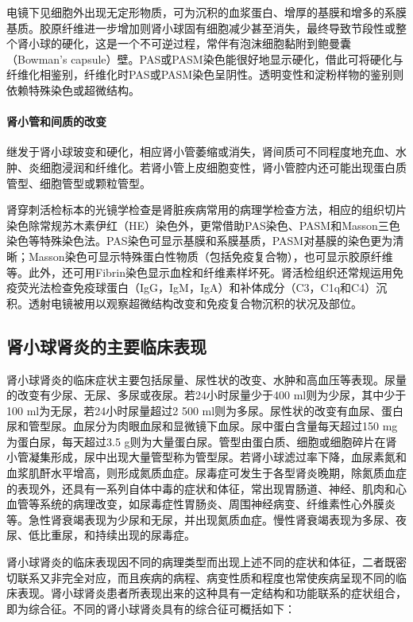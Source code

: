 电镜下见细胞外出现无定形物质，可为沉积的血浆蛋白、增厚的基膜和增多的系膜基质。胶原纤维进一步增加则肾小球固有细胞减少甚至消失，最终导致节段性或整个肾小球的硬化，这是一个不可逆过程，常伴有泡沫细胞黏附到鲍曼囊（Bowman's
capsule）壁。PAS或PASM染色能很好地显示硬化，借此可将硬化与纤维化相鉴别，纤维化时PAS或PASM染色呈阴性。透明变性和淀粉样物的鉴别则依赖特殊染色或超微结构。

\paragraph{肾小管和间质的改变}
继发于肾小球玻变和硬化，相应肾小管萎缩或消失，肾间质可不同程度地充血、水肿、炎细胞浸润和纤维化。若肾小管上皮细胞变性，肾小管腔内还可能出现蛋白质管型、细胞管型或颗粒管型。

肾穿刺活检标本的光镜学检查是肾脏疾病常用的病理学检查方法，相应的组织切片染色除常规苏木素伊红（HE）染色外，更常借助PAS染色、PASM和Masson三色染色等特殊染色法。PAS染色可显示基膜和系膜基质，PASM对基膜的染色更为清晰；Masson染色可显示特殊蛋白性物质（包括免疫复合物），也可显示胶原纤维等。此外，还可用Fibrin染色显示血栓和纤维素样坏死。肾活检组织还常规运用免疫荧光法检查免疫球蛋白（IgG，IgM，IgA）和补体成分（C3，C1q和C4）沉积。透射电镜被用以观察超微结构改变和免疫复合物沉积的状况及部位。

\subsection{肾小球肾炎的主要临床表现}

肾小球肾炎的临床症状主要包括尿量、尿性状的改变、水肿和高血压等表现。尿量的改变有少尿、无尿、多尿或夜尿。若24小时尿量少于400
ml则为少尿，其中少于100 ml为无尿，若24小时尿量超过2 500
ml则为多尿。尿性状的改变有血尿、蛋白尿和管型尿。血尿分为肉眼血尿和显微镜下血尿。尿中蛋白含量每天超过150
mg为蛋白尿，每天超过3.5
g则为大量蛋白尿。管型由蛋白质、细胞或细胞碎片在肾小管凝集形成，尿中出现大量管型称为管型尿。若肾小球滤过率下降，血尿素氮和血浆肌酐水平增高，则形成氮质血症。尿毒症可发生于各型肾炎晚期，除氮质血症的表现外，还具有一系列自体中毒的症状和体征，常出现胃肠道、神经、肌肉和心血管等系统的病理改变，如尿毒症性胃肠炎、周围神经病变、纤维素性心外膜炎等。急性肾衰竭表现为少尿和无尿，并出现氮质血症。慢性肾衰竭表现为多尿、夜尿、低比重尿，和持续出现的尿毒症。

肾小球肾炎的临床表现因不同的病理类型而出现上述不同的症状和体征，二者既密切联系又非完全对应，而且疾病的病程、病变性质和程度也常使疾病呈现不同的临床表现。肾小球肾炎患者所表现出来的这种具有一定结构和功能联系的症状组合，即为综合征。不同的肾小球肾炎具有的综合征可概括如下：

